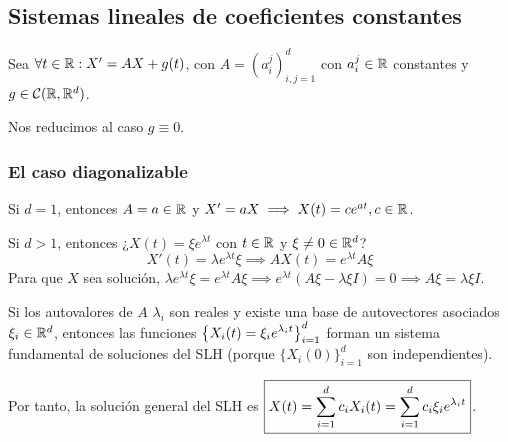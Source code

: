 
\subsection{Sistemas lineales de coeficientes constantes}

Sea $\forall t \in \mathbb{R} : X'=AX + g(t)$, con $A =\left(a_i^j\right)_{i,j=1}^d$ con $a_i^j \in \mathbb{R}$ constantes y $g \in \mathcal{C}(\mathbb{R}, \mathbb{R}^d)$.

Nos reducimos al caso $g\equiv 0$.
\subsubsection{El caso diagonalizable}

Si $d=1$, entonces $A = a \in \mathbb{R}$ y $X' = aX \implies X(t) = c e^{at}, c\in \mathbb{R}$.

Si $d>1$, entonces ¿$X(t)=\xi e^{\lambda t}$ con $t \in \mathbb{R}$ y $\xi \ne 0 \in \mathbb{R}^d$?
\[X'(t) = \lambda e^{\lambda t} \xi \implies AX(t) = e^{\lambda t} A\xi\]
Para que $X$ sea solución, $\lambda e^{\lambda t} \xi = e^{\lambda t} A\xi \implies e^{\lambda t} \left(A\xi - \lambda \xi I\right) = 0 \implies A\xi = \lambda \xi I$.

Si los autovalores de $A$ $\lambda_i$ son reales y existe una base de autovectores asociados $\xi_i\in\mathbb{R}^d$, entonces las funciones $\displaystyle \left\{X_i(t) = \xi_i e^{\lambda_i t}\right\}_{i=1}^d$ forman un sistema fundamental de soluciones del SLH (porque $\{X_i(0)\}_{i=1}^d$ son independientes).

Por tanto, la solución general del SLH es $\displaystyle \boxed{X(t) = \sum_{i=1}^d c_i X_i(t) =  \sum_{i=1}^{d} c_i \xi_i e^{\lambda_i t}}$.

